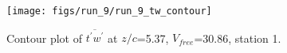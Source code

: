 \begin{figure}[H]
\centering
\texttt{[image: figs/run\_9/run\_9\_tw\_contour]}
\caption{Contour plot of $\overline{t^\prime w^\prime}$ at $z/c$=5.37, $V_{free}$=30.86, station 1.}
\label{fig:run_9_tw_contour}
\end{figure}


